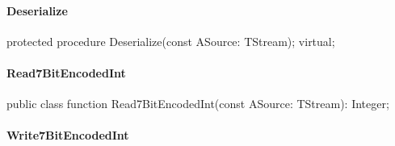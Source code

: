 \documentclass{report}
\newif\ifpdf
\begin{document}
\paragraph*{Deserialize}\hspace*{\fill}

\label{PasDoc_Serialize.TSerializable-Deserialize}
\begin{list}{}{
\setlength{\itemindent}{0cm}
\setlength{\listparindent}{0cm}
\setlength{\leftmargin}{\evensidemargin}
\addtolength{\leftmargin}{\tmplength}
\settowidth{\labelsep}{X}
\addtolength{\leftmargin}{\labelsep}
\setlength{\labelwidth}{\tmplength}
}
\item[\textbf{Declaration}\hfill]
\ifpdf
\begin{flushleft}
\fi
\begin{ttfamily}
protected procedure Deserialize(const ASource: TStream); virtual;\end{ttfamily}

\ifpdf
\end{flushleft}
\fi

\end{list}
\paragraph*{Read7BitEncodedInt}\hspace*{\fill}

\label{PasDoc_Serialize.TSerializable-Read7BitEncodedInt}
\begin{list}{}{
\setlength{\itemindent}{0cm}
\setlength{\listparindent}{0cm}
\setlength{\leftmargin}{\evensidemargin}
\addtolength{\leftmargin}{\tmplength}
\settowidth{\labelsep}{X}
\addtolength{\leftmargin}{\labelsep}
\setlength{\labelwidth}{\tmplength}
}
\item[\textbf{Declaration}\hfill]
\ifpdf
\begin{flushleft}
\fi
\begin{ttfamily}
public class function Read7BitEncodedInt(const ASource: TStream): Integer;\end{ttfamily}

\ifpdf
\end{flushleft}
\fi

\end{list}
\paragraph*{Write7BitEncodedInt}\hspace*{\fill}
\end{document}
